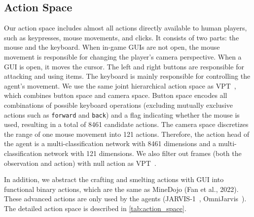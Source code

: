 \subsection{Action Space}
Our action space includes almost all actions directly available to human players, such as keypresses,
mouse movements, and clicks. It consists of two parts: the mouse and the keyboard. When in-game GUIs are not open, the mouse movement is responsible for changing the player’s camera perspective. When a GUI is open, it moves the cursor. The left and
right buttons are responsible for attacking and using items. The keyboard is mainly responsible for
controlling the agent’s movement. We use the same joint hierarchical action space as VPT~\citep{vpt}, which combines button space and camera space. Button space encodes all combinations of possible keyboard operations (excluding mutually exclusive actions such as \texttt{forward} and \texttt{back}) and a
flag indicating whether the mouse is used, resulting in a total of 8461 candidate actions. The camera
space discretizes the range of one mouse movement into 121 actions. Therefore, the action head of
the agent is a multi-classification network with 8461 dimensions and a multi-classification network
with 121 dimensions. We also filter out frames (both the observation and action) with null action as VPT~\citep{vpt}.

In addition, we abstract the crafting and smelting actions with GUI into functional binary actions,
which are the same as MineDojo (Fan et al., 2022). These advanced actions are only used by the agents (JARVIS-1~\citep{jarvis-1}, OmniJarvis~\citep{omnijarvis}). The detailed action space is described in \cref{tab:action_space}.

